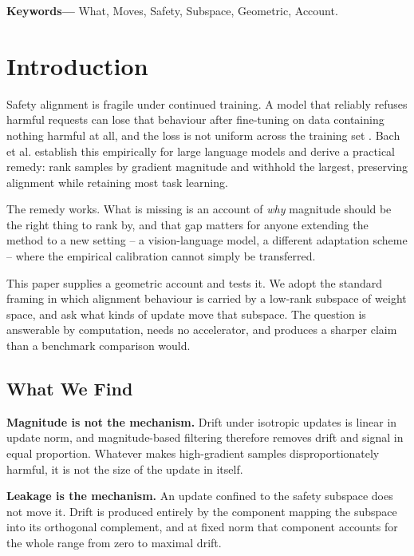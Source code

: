 \documentclass[10pt,journal,compsoc,twocolumn]{IEEEtran}
\begin{document}
\noindent\textbf{Keywords---} What, Moves, Safety, Subspace, Geometric, Account.







\section{Introduction}


Safety alignment is fragile under continued training. A model that reliably refuses harmful requests can lose that behaviour after fine-tuning on data containing nothing harmful at all, and the loss is not uniform across the training set \cite{arxiv_2604_17215}. Bach et al. establish this empirically for large language models and derive a practical remedy: rank samples by gradient magnitude and withhold the largest, preserving alignment while retaining most task learning.

The remedy works. What is missing is an account of \textit{why} magnitude should be the right thing to rank by, and that gap matters for anyone extending the method to a new setting -- a vision-language model, a different adaptation scheme -- where the empirical calibration cannot simply be transferred.

This paper supplies a geometric account and tests it. We adopt the standard framing in which alignment behaviour is carried by a low-rank subspace of weight space, and ask what kinds of update move that subspace. The question is answerable by computation, needs no accelerator, and produces a sharper claim than a benchmark comparison would.


\subsection{What We Find}


\textbf{Magnitude is not the mechanism.} Drift under isotropic updates is linear in update norm, and magnitude-based filtering therefore removes drift and signal in equal proportion. Whatever makes high-gradient samples disproportionately harmful, it is not the size of the update in itself.

\textbf{Leakage is the mechanism.} An update confined to the safety subspace does not move it. Drift is produced entirely by the component mapping the subspace into its orthogonal complement, and at fixed norm that component accounts for the whole range from zero to maximal drift.
\end{document}
